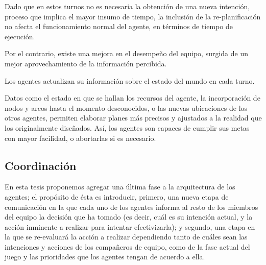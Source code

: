 Dado que en estos turnos no es
necesaria la obtención de una nueva intención, proceso que implica el
mayor insumo de tiempo, la inclusión de la re-planificación no afecta
el funcionamiento normal del agente, en términos de tiempo de
ejecución.



Por el contrario, existe una mejora en el desempeño del equipo,
surgida de un mejor aprovechamiento de la información percibida. 

Los
agentes actualizan su información sobre el estado del mundo en cada
turno. 

Datos como el estado en que se hallan los recursos del agente,
la incorporación de nodos y arcos hasta el momento desconocidos, o las
nuevas ubicaciones de los otros agentes, permiten elaborar planes más
precisos y ajustados a la realidad que los originalmente diseñados.
Así, los agentes son capaces de cumplir sus metas con mayor
facilidad, o abortarlas si es necesario.



\subsection{Coordinación}
\label{sec:coordinacion}



En esta tesis proponemos agregar una última fase a la arquitectura de
los agentes; el propósito de ésta es introducir, primero, una nueva
etapa de comunicación en la que cada uno de los agentes informa al
resto de los miembros del equipo la decisión que ha tomado (es decir,
cuál es su intención actual, y la acción inminente a realizar para
intentar efectivizarla); y segundo, una etapa en la que se re-evaluará
la acción a realizar dependiendo tanto de cuáles sean las intenciones
y acciones de los compañeros de equipo, como de la fase actual del
juego y las prioridades que los agentes tengan de acuerdo a ella.



